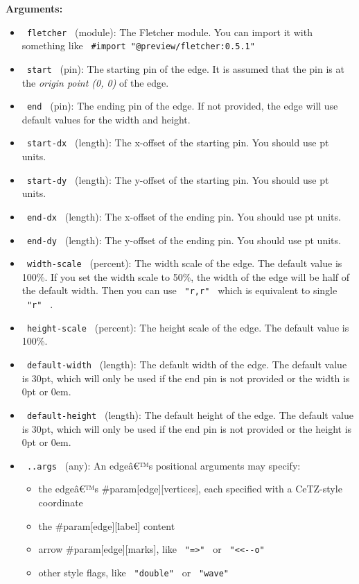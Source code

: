 \textbf{Arguments:}

\begin{itemize}
\tightlist
\item
  \texttt{\ fletcher\ } (module): The Fletcher module. You can import it
  with something like \texttt{\ \#import\ "@preview/fletcher:0.5.1"\ }
\item
  \texttt{\ start\ } (pin): The starting pin of the edge. It is assumed
  that the pin is at the \emph{origin point (0, 0)} of the edge.
\item
  \texttt{\ end\ } (pin): The ending pin of the edge. If not provided,
  the edge will use default values for the width and height.
\item
  \texttt{\ start-dx\ } (length): The x-offset of the starting pin. You
  should use pt units.
\item
  \texttt{\ start-dy\ } (length): The y-offset of the starting pin. You
  should use pt units.
\item
  \texttt{\ end-dx\ } (length): The x-offset of the ending pin. You
  should use pt units.
\item
  \texttt{\ end-dy\ } (length): The y-offset of the ending pin. You
  should use pt units.
\item
  \texttt{\ width-scale\ } (percent): The width scale of the edge. The
  default value is 100\%. If you set the width scale to 50\%, the width
  of the edge will be half of the default width. Then you can use
  \texttt{\ "r,r"\ } which is equivalent to single \texttt{\ "r"\ } .
\item
  \texttt{\ height-scale\ } (percent): The height scale of the edge. The
  default value is 100\%.
\item
  \texttt{\ default-width\ } (length): The default width of the edge.
  The default value is 30pt, which will only be used if the end pin is
  not provided or the width is 0pt or 0em.
\item
  \texttt{\ default-height\ } (length): The default height of the edge.
  The default value is 30pt, which will only be used if the end pin is
  not provided or the height is 0pt or 0em.
\item
  \texttt{\ ..args\ } (any): An edgeâ€™s positional arguments may
  specify:

  \begin{itemize}
  \tightlist
  \item
    the edgeâ€™s \#param{[}edge{]}{[}vertices{]}, each specified with a
    CeTZ-style coordinate
  \item
    the \#param{[}edge{]}{[}label{]} content
  \item
    arrow \#param{[}edge{]}{[}marks{]}, like
    \texttt{\ "=\textgreater{}"\ } or
    \texttt{\ "\textless{}\textless{}-\textbar{}-o"\ }
  \item
    other style flags, like \texttt{\ "double"\ } or \texttt{\ "wave"\ }
  \end{itemize}
\end{itemize}

